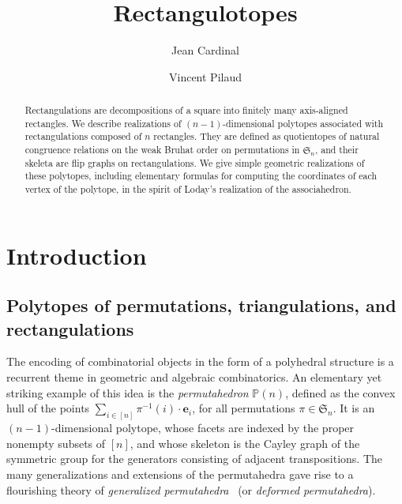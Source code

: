 \documentclass{amsart}
\title{Rectangulotopes}
\author{Jean Cardinal}
\author{Vincent Pilaud}
\theoremstyle{definition}
\newcommand{\f}[1]{\mathfrak{#1}} %
\newcommand{\darkblue}{\color{darkblue}} %
\newcommand{\defn}[1]{\textsl{\darkblue #1}} %
\newcommand{\polytope}[1]{\mathds{#1}} %
\newcommand{\Perm}{\polytope{P}} %
\begin{document}
\begin{abstract}
  Rectangulations are decompositions of a square into finitely many axis-aligned rectangles.
  We describe realizations of $(n-1)$-dimensional polytopes associated with rectangulations composed of $n$ rectangles.
  They are defined as quotientopes of natural congruence relations on the weak Bruhat order on permutations in $\f{S}_n$, and their skeleta are flip graphs on rectangulations.
  We give simple geometric realizations of these polytopes, including elementary formulas for computing the coordinates of each vertex of the polytope, in the spirit of Loday's realization of the associahedron.
\end{abstract}

\maketitle

\tableofcontents


\section{Introduction}

\subsection{Polytopes of permutations, triangulations, and rectangulations}

The encoding of combinatorial objects in the form of a polyhedral structure is a recurrent theme in geometric and algebraic combinatorics.
An elementary yet striking example of this idea is the \defn{permutahedron} $\Perm (n)$, defined as the convex hull of the points $\sum_{i\in [n]} \pi^{-1}(i)\cdot \mathbf{e}_i$, for all permutations $\pi\in\f{S}_n$.
It is an $(n-1)$-dimensional polytope, whose facets are indexed by the proper nonempty subsets of $[n]$, and whose skeleton is the Cayley graph of the symmetric group for the generators consisting of adjacent transpositions.
The many generalizations and extensions of the permutahedra gave rise to a flourishing theory of \defn{generalized permutahedra}~\cite{Postnikov} (or \defn{deformed permutahedra}).
\end{document}
